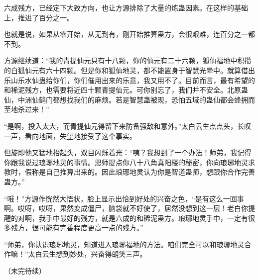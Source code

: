 \begin{this_body}
六成残方，已经定下大致方向，也让方源排除了大量的炼蛊因素。在这样的基础上，推进了百分之一。

也就是说，如果从零开始，从无到有，刚开始推算蛊方，会很艰难，连百分之一都不到。

方源继续道：“我的青提仙元只有十八颗，你的仙元有二十六颗，狐仙福地中积攒的白狐仙元有六十四颗。但是你和狐仙地灵，都不能置身于智慧光晕中。就算借出乐山乐水仙蛊给你们，你们催用出来的乐意，我又用不了。目前而言，最有希望的和稀泥残方，也需要将近四十颗青提仙元。可你别忘了，我们并不安全。北原蛊仙，中洲仙鹤门都想找我们的麻烦。若是智慧蛊被现，恐怕五域的蛊仙都会蜂拥而至地杀过来！”

“是啊，投入太大，而青提仙元得留下来防备强敌和意外。”太白云生点点头，长叹一声，看向地面，失望地接受了这个事实。

但旋即他又猛地抬起头，双目闪烁着光：“咦？我想到了一个办法！师弟，我记得你跟我说过琅琊地灵的事情。恩师提点你八十八角真阳楼的秘密，你向琅琊地灵求教时，假称是自己推算出来的。因此琅琊地灵认为你是智道蛊师，想跟你合作完善蛊方。”

“哦！”方源作恍然大悟状，脸上显示出恰到好处的兴奋之色，“是有这么一回事啊。哎呀，哎呀，果然变成僵尸，脑袋就不好使了，居然没想到这一层！老白你提醒的对啊，我手中最好的残方，就是六成的和稀泥蛊方。琅琊地灵手中，一定有很多残方，很可能有完善程度更高一点的残方。”

“师弟，你认识琅琊地灵，知道进入琅琊福地的方法。咱们完全可以和琅琊地灵合作嘛！”太白云生想到妙处，兴奋得朗笑三声。

（未完待续）

\end{this_body}

